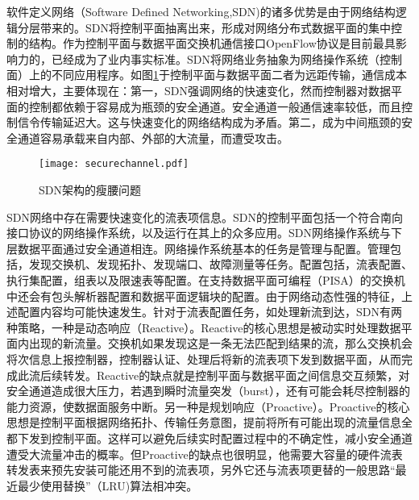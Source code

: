 
\label{sec:pdpintro}


 \label{chap24}





软件定义网络（Software Defined Networking,SDN)的诸多优势是由于网络结构逻辑分层带来的。SDN将控制平面抽离出来，形成对网络分布式数据平面的集中控制的结构。作为控制平面与数据平面交换机通信接口OpenFlow协议是目前最具影响力的，已经成为了业内事实标准。SDN将网络业务抽象为网络操作系统（控制面）上的不同应用程序。如图\ref{fig:securechannel}于控制平面与数据平面二者为远距传输，通信成本相对增大，主要体现在：第一，SDN强调网络的快速变化，然而控制器对数据平面的控制都依赖于容易成为瓶颈的安全通道。安全通道一般通信速率较低，而且控制信令传输延迟大。这与快速变化的网络结构成为矛盾。第二，成为中间瓶颈的安全通道容易承载来自内部、外部的大流量，而遭受攻击。

\begin{figure}[!ht]
	\centering 
	\vspace{-1.5mm}
	\texttt{[image: securechannel.pdf]}
	\caption{SDN架构的瘦腰问题} \label{fig:securechannel}
\end{figure}

SDN网络中存在需要快速变化的流表项信息。SDN的控制平面包括一个符合南向接口协议的网络操作系统，以及运行在其上的众多应用。SDN网络操作系统与下层数据平面通过安全通道相连。网络操作系统基本的任务是管理与配置。管理包括，发现交换机、发现拓扑、发现端口、故障测量等任务。配置包括，流表配置、执行集配置，组表以及限速表等配置。在支持数据平面可编程（PISA）的交换机中还会有包头解析器配置和数据平面逻辑块的配置。由于网络动态性强的特征，上述配置内容均可能快速发生。针对于流表配置任务，如处理新流到达，SDN有两种策略，一种是动态响应（Reactive）。Reactive的核心思想是被动实时处理数据平面内出现的新流量。交换机如果发现这是一条无法匹配到结果的流，那么交换机会将次信息上报控制器，控制器认证、处理后将新的流表项下发到数据平面，从而完成此流后续转发。Reactive的缺点就是控制平面与数据平面之间信息交互频繁，对安全通道造成很大压力，若遇到瞬时流量突发（burst），还有可能会耗尽控制器的能力资源，使数据面服务中断。另一种是规划响应（Proactive）。Proactive的核心思想是控制平面根据网络拓扑、传输任务意图，提前将所有可能出现的流量信息全都下发到控制平面。这样可以避免后续实时配置过程中的不确定性，减小安全通道遭受大流量冲击的概率。但Proactive的缺点也很明显，他需要大容量的硬件流表转发表来预先安装可能还用不到的流表项，另外它还与流表项更替的一般思路“最近最少使用替换”（LRU)算法相冲突。




